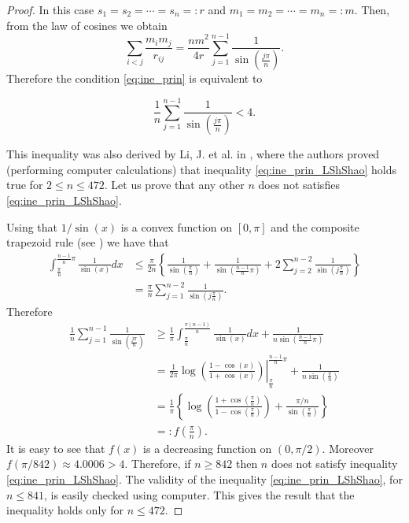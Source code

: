 \documentclass[twoside]{article}
\theoremstyle{remark}
\begin{document}
\begin{proof}
In this case $s_1=s_2=\cdots=s_n=:r$ and $m_1=m_2=\cdots=m_n=:m$. Then, from the law of cosines we obtain
\[
 \sum_{i<j}\frac{m_im_j}{r_{ij}}=\frac{nm^2}{4r}\sum_{j=1}^{n-1}\frac{1}{\sin\left(\frac{j\pi}{n}\right)}.
\]
Therefore the condition \eqref{eq:ine_prin} is equivalent to

\begin{equation}\label{eq:ine_prin_LShShao}
  \frac1n\sum_{j=1}^{n-1}\frac{1}{\sin\left(\frac{j\pi}{n}\right)}<4.
\end{equation}

This inequality was also derived by Li, J. et al. in \cite{li2013characterization}, where the authors proved (performing computer calculations) that inequality \eqref{eq:ine_prin_LShShao} holds true for $2\leq n\leq 472$. Let us prove that any other $n$ does not satisfies \eqref{eq:ine_prin_LShShao}.


Using that $1/\sin (x)$ is a convex function on $[0,\pi]$ and the composite trapezoid rule (see \cite{kincaid1991numerical}) we have that
\[
\begin{split}
 \int_{\frac{\pi}{n}}^{\frac{n-1}{n}\pi}\frac{1}{\sin (x)}dx&\leq \frac{\pi}{2n}\left\{ \frac{1}{\sin(\frac{\pi}{n})} + \frac{1}{\sin(\frac{n-1}{n}\pi)} +2\sum_{j=2}^{n-2}\frac{1}{\sin(j\frac{\pi}{n})} \right\}\\
 &=\frac{\pi}{n}\sum_{j=1}^{n-2}\frac{1}{\sin(j\frac{\pi}{n})}.
\end{split}
\]
Therefore
\[
\begin{split}
 \frac1n \sum_{j=1}^{n-1}\frac{1}{\sin\left(\frac{j\pi}{n}\right)}&\geq \frac{1}{\pi}\int_{\frac{\pi}{n}}^{\frac{\pi(n-1)}{n}}\frac{1}{\sin (x)}dx+\frac{1}{n\sin\left(\frac{n-1}{n}\pi\right)}\\
 &=\left.\frac{1}{2\pi}\log \left( \frac{1-\cos(x)}{1+\cos(x)}\right)\right|_{\frac{\pi}{n}}^{\frac{n-1}{n}\pi}+\frac{1}{n\sin\left(\frac{\pi}{n}\right)}\\
 &=\frac{1}{\pi}\left\{\log \left(\frac{1+\cos(\frac{\pi}{n})}{1-\cos(\frac{\pi}{n})}\right)+\frac{\pi/n}{\sin\left(\frac{\pi}{n}\right)}\right\}\\
 &=:f\left(\frac{\pi}{n} \right).
 \end{split}
\]
It is easy to see that $f(x)$ is a decreasing function on $(0,\pi/2)$. Moreover $f(\pi/842)\approx 4.0006>4$. Therefore, if $n\geq 842$ then $n$ does not satisfy inequality \eqref{eq:ine_prin_LShShao}. The validity of the inequality \eqref{eq:ine_prin_LShShao}, for $n\leq 841$, is easily checked using computer. This gives the result that the inequality holds only for $n \leq 472$.
\end{proof}
\end{document}
